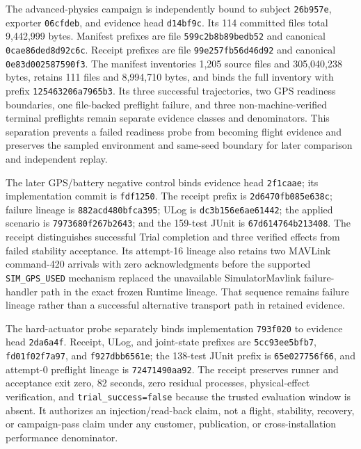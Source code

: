 The advanced-physics campaign is independently bound to subject
\texttt{26b957e}, exporter \texttt{06cfdeb}, and evidence head
\texttt{d14bf9c}. Its 114 committed files total 9,442,999 bytes.
Manifest prefixes are file \texttt{599c2b8b89bedb52} and canonical
\texttt{0cae86ded8d92c6c}. Receipt prefixes are file
\texttt{99e257fb56d46d92} and canonical \texttt{0e83d002587590f3}. The
manifest inventories 1,205 source files
and 305,040,238 bytes, retains 111 files and 8,994,710 bytes, and binds
the full inventory with prefix \texttt{125463206a7965b3}. Its three
successful trajectories, two GPS readiness boundaries, one file-backed
preflight failure, and three non-machine-verified terminal preflights
remain separate evidence classes and denominators. This separation
prevents a failed readiness probe from becoming flight evidence and preserves
the sampled environment and same-seed boundary for later comparison and
independent replay.

The later GPS/battery negative control binds evidence head
\texttt{2f1caae}; its implementation commit is \texttt{fdf1250}. The
receipt prefix is \texttt{2d6470fb085e638c}; failure lineage is
\texttt{882acd480bfca395}; ULog is \texttt{dc3b156e6ae61442}; the applied
scenario is \texttt{7973680f267b2643}; and the 159-test JUnit is
\texttt{67d614764b213408}. The receipt
distinguishes successful Trial completion and three verified effects from
failed stability acceptance. Its attempt-16 lineage also retains two
MAVLink command-420 arrivals with zero acknowledgments before the supported
\texttt{SIM\_GPS\_USED} mechanism replaced the unavailable
SimulatorMavlink failure-handler path in the exact frozen Runtime lineage.
That sequence remains failure lineage rather than a successful alternative
transport path in retained evidence.

The hard-actuator probe separately binds implementation \texttt{793f020}
to evidence head \texttt{2da6a4f}. Receipt, ULog, and joint-state prefixes
are \texttt{5cc93ee5bfb7}, \texttt{fd01f02f7a97}, and
\texttt{f927dbb6561e}; the 138-test JUnit prefix is
\texttt{65e027756f66}, and attempt-0 preflight lineage is
\texttt{72471490aa92}. The receipt preserves runner and acceptance
exit zero, 82 seconds, zero residual processes, physical-effect
verification, and \texttt{trial\_success=false} because the trusted
evaluation window is absent. It authorizes an injection/read-back claim,
not a flight, stability, recovery, or campaign-pass claim under any
customer, publication, or cross-installation performance denominator.

